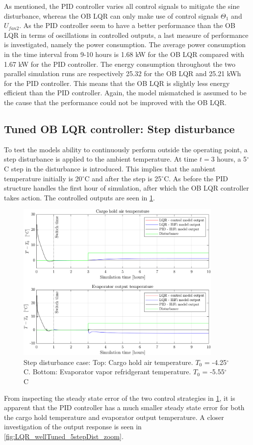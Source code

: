 As mentioned, the PID controller varies all control signals to mitigate the sine disturbance, whereas the OB LQR can only make use of control signals $ \Theta_1 $ and $ U_{fan2} $. As the PID controller seem to have a better performance than the OB LQR in terms of oscillations in controlled outputs, a last measure of performance is investigated, namely the power consumption.  
The average power consumption in the time interval from 9-10 hours is 1.68 \si{kW} for the OB LQR compared with 1.67 \si{kW} for the PID controller. The energy consumption throughout the two parallel simulation runs are respectively 25.32 for the OB LQR and 25.21 \si{kWh} for the PID controller. This means that the OB LQR is slightly less energy efficient than the PID controller. Again, the model mismatched is assumed to be the cause that the performance could not be improved with the OB LQR.

\subsection{Tuned OB LQR controller: Step disturbance}
To test the models ability to continuously perform outside the operating point, a step disturbance is applied to the ambient temperature.  At time $t=3$ hours, a 5$^{\circ}$C step in the disturbance is introduced. This implies that the ambient temperature initially is 20$^{\circ}$C and after the step is 25$^{\circ}$C. As before the PID structure handles the first hour of simulation, after which the OB LQR controller takes action. The controlled outputs are seen in \cref{fig:LQR_wellTuned_5stepDist}.
\begin{figure}[H]
	\centering
	\includegraphics[width=0.9\textwidth]{Graphics/fig_LQRvsKresten_stepDist.png}
	\caption{Step disturbance case: Top: Cargo hold air temperature. $T_0$ = -4.25$^{\circ}$C. Bottom: Evaporator vapor refridgerant temperature. $T_0$ = -5.55$^{\circ}$C}
	\label{fig:LQR_wellTuned_5stepDist}
\end{figure}
From inspecting the steady state error of the two control strategies in \cref{fig:LQR_wellTuned_5stepDist}, it is apparent that the PID controller has a much smaller steady state error for both the cargo hold temperature and evaporator output temperature. A closer investigation of the output response is seen in
\cref{fig:LQR_wellTuned_5stepDist_zoom}. 

